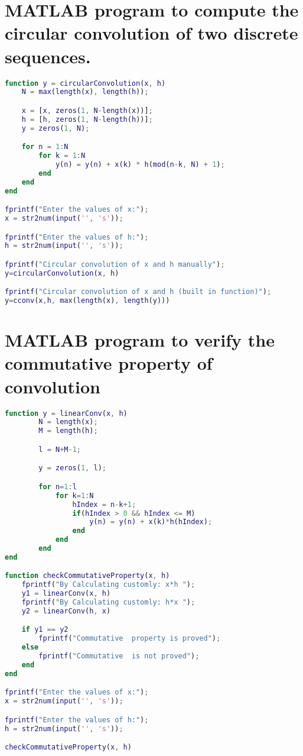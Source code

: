 \documentclass{article}
\begin{document}
\newpage


\section{MATLAB program to compute the circular convolution of two discrete sequences.}
\begin{lstlisting}[language=matlab, caption=MATLAB program to compute the circular convolution of two discrete sequences]
function y = circularConvolution(x, h)
    N = max(length(x), length(h));

    x = [x, zeros(1, N-length(x))];
    h = [h, zeros(1, N-length(h))];
    y = zeros(1, N);

    for n = 1:N
        for k = 1:N
            y(n) = y(n) + x(k) * h(mod(n-k, N) + 1);
        end
    end
end

fprintf("Enter the values of x:");
x = str2num(input('', 's'));

fprintf("Enter the values of h:");
h = str2num(input('', 's'));

fprintf("Circular convolution of x and h manually");
y=circularConvolution(x, h)

fprintf("Circular convolution of x and h (built in function)");
y=cconv(x,h, max(length(x), length(y)))

\end{lstlisting}


\section{MATLAB program to verify the commutative property of convolution}
\begin{lstlisting}[language=matlab, caption=MATLAB program to verify the commutative property of convolution]
function y = linearConv(x, h)
        N = length(x);
        M = length(h);

        l = N+M-1;

        y = zeros(1, l);

        for n=1:l
            for k=1:N
                hIndex = n-k+1;
                if(hIndex > 0 && hIndex <= M)
                    y(n) = y(n) + x(k)*h(hIndex);
                end
            end
        end
end

function checkCommutativeProperty(x, h)
    fprintf("By Calculating customly: x*h ");
    y1 = linearConv(x, h)
    fprintf("By Calculating customly: h*x ");
    y2 = linearConv(h, x)

    if y1 == y2
        fprintf("Commutative  property is proved");
    else
        fprintf("Commutative  is not proved");
    end
end

fprintf("Enter the values of x:");
x = str2num(input('', 's'));

fprintf("Enter the values of h:");
h = str2num(input('', 's'));

checkCommutativeProperty(x, h)
\end{lstlisting}
\end{document}
